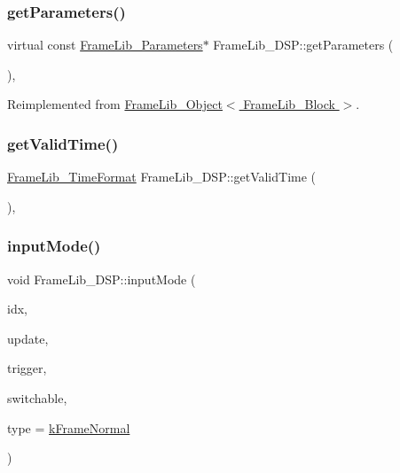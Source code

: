 \subsubsection{\texorpdfstring{get\+Parameters()}{getParameters()}}
{\footnotesize\ttfamily virtual const \hyperlink{class_frame_lib___parameters}{Frame\+Lib\+\_\+\+Parameters}$\ast$ Frame\+Lib\+\_\+\+D\+S\+P\+::get\+Parameters (\begin{DoxyParamCaption}{ }\end{DoxyParamCaption})\hspace{0.3cm}{\ttfamily [inline]}, {\ttfamily [virtual]}}



Reimplemented from \hyperlink{class_frame_lib___object_aaebb53211e0617e9203d1088c2fcb9c2}{Frame\+Lib\+\_\+\+Object$<$ Frame\+Lib\+\_\+\+Block $>$}.

\mbox{\label{class_frame_lib___d_s_p_ac0c0353bfbac1d75bc789f96382d6637}} 
\subsubsection{\texorpdfstring{get\+Valid\+Time()}{getValidTime()}}
{\footnotesize\ttfamily \hyperlink{_frame_lib___types_8h_a699a4071a9eaaa283906a5ebd0a79ac0}{Frame\+Lib\+\_\+\+Time\+Format} Frame\+Lib\+\_\+\+D\+S\+P\+::get\+Valid\+Time (\begin{DoxyParamCaption}{ }\end{DoxyParamCaption})\hspace{0.3cm}{\ttfamily [inline]}, {\ttfamily [protected]}}

\mbox{\label{class_frame_lib___d_s_p_af9c0571cc8f82bb560be0f0cfcd73d78}} 
\subsubsection{\texorpdfstring{input\+Mode()}{inputMode()}}
{\footnotesize\ttfamily void Frame\+Lib\+\_\+\+D\+S\+P\+::input\+Mode (\begin{DoxyParamCaption}\item[{unsigned long}]{idx,  }\item[{bool}]{update,  }\item[{bool}]{trigger,  }\item[{bool}]{switchable,  }\item[{\hyperlink{_frame_lib___types_8h_ad495a9f61af7fff07d7e97979d1ab854}{Frame\+Type}}]{type = {\ttfamily \hyperlink{_frame_lib___types_8h_ad495a9f61af7fff07d7e97979d1ab854a4bc2388cbdd721f5039a32f95cd92b03}{k\+Frame\+Normal}} }\end{DoxyParamCaption})\hspace{0.3cm}{\ttfamily [protected]}}

